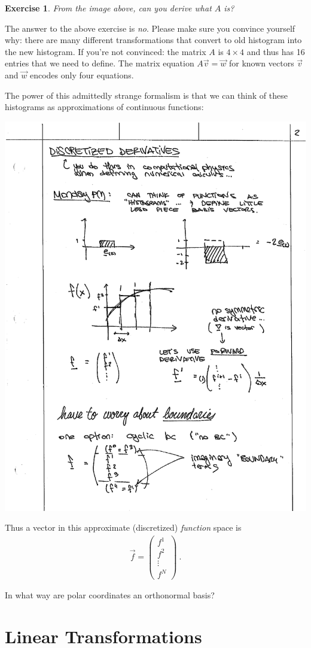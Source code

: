 \documentclass[
  11pt,
	colorful,
	raggedright,
]{tufte-style-thesis-flip}
\newtheorem{exercise}{Exercise}[section]
\begin{document}
\begin{exercise}
From the image above, can you derive what $A$ is? 
\end{exercise}

\noindent The answer to the above exercise is \emph{no}. Please make sure you convince yourself why: there are many different transformations that convert to old histogram into the new histogram. If you're not convinced: the matrix $A$ is $4\times 4$ and thus has 16 entries that we need to define. The matrix equation $A\vec{v} = \vec{w}$ for known vectors $\vec{v}$ and $\vec{w}$ encodes only four equations.

The power of this admittedly strange formalism is that we can think of these histograms as approximations of continuous functions:

\begin{center}
\includegraphics[width=.4\textwidth]{figures/lec02_histfun.pdf}
\end{center}

Thus a vector in this approximate (discretized) \emph{function} space is 
\begin{align}
  \vec{f} = 
  \begin{pmatrix}
    f^1 \\
    f^2 \\
    \vdots\\
    f^N
  \end{pmatrix} \ .
\end{align}



In what way are polar coordinates an orthonormal basis? 


\section{Linear Transformations}
\end{document}
